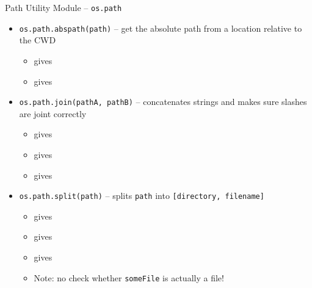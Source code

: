 \begin{frame}{Path Utility Module -- \texttt{os.path}}
%
\begin{itemize}
\item \texttt{os.path.abspath(path)} -- get the absolute path from a location relative to the CWD
	\begin{itemize}
	\item {} gives 
	\item {} gives 
	\end{itemize}
\item \texttt{os.path.join(pathA, pathB)} -- concatenates strings and makes sure slashes are joint correctly
	\begin{itemize}
	\item {} gives 
	\item {} gives 
	\item {} gives 
	\end{itemize}
\item \texttt{os.path.split(path)} -- splits \texttt{path} into \texttt{[directory, filename]}
	\begin{itemize}
	\item {} gives 
	\item {} gives 
	\item {} gives \inPy{["", "someFile"]}
	\item Note: no check whether \texttt{someFile} is actually a file!
	\end{itemize}
\end{itemize}
%
\end{frame}


